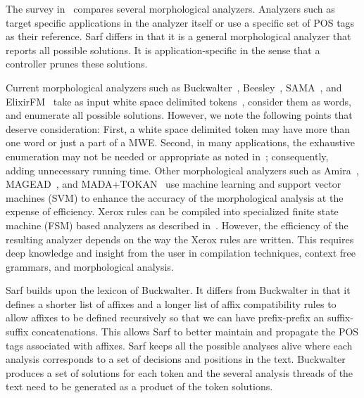 \documentclass[11pt]{article}
\begin{document}
The survey in~\cite{Sughaiyer:04} compares
several morphological analyzers. 
Analyzers such as~\cite{Khoja:01,Darwish:02} 
target specific applications in the 
analyzer itself or use a specific set of POS tags
as their reference.
Sarf differs in that it is a general morphological 
analyzer that reports all possible solutions. 
It is application-specific in the sense that a controller 
prunes these solutions. 

Current morphological analyzers such as %
Buckwalter~,
Beesley~,
SAMA~\cite{Kulick:10},
and ElixirFM~\cite{Otakar:07} 
take as input white space delimited tokens~\cite{Kulick:10},
consider them as words,
and enumerate all possible solutions. 
However, we note the following points that deserve consideration:
First, a white space delimited token may have 
more than one word or just a part of a MWE.
Second, in many applications, the exhaustive enumeration may not be needed or appropriate as noted in~\cite{Maamouri:10}; consequently, adding unnecessary running time.
Other morphological analyzers such as 
Amira~\cite{Diab:07,Benajiba:07},
MAGEAD~\cite{Habash:05}, and MADA+TOKAN~\cite{Habash:09} 
use machine learning and support vector machines (SVM) 
to enhance the accuracy of the morphological analysis at the expense 
of efficiency.
Xerox rules can be compiled into specialized finite state
machine (FSM) based analyzers as described in~\cite{Beesley:03}.
However, the efficiency of the resulting analyzer depends on the
way the Xerox rules are written. 
This requires deep knowledge and insight from the user
in compilation techniques, context free grammars, 
and morphological analysis.

Sarf builds upon the lexicon of Buckwalter.
It differs from Buckwalter in that it defines a shorter list of affixes
and a longer list of affix compatibility rules to allow 
affixes to be defined recursively
so that we can have prefix-prefix an suffix-suffix 
concatenations.
This allows Sarf to better maintain and propagate 
the POS tags associated with affixes. 
Sarf keeps all the possible analyses alive where each analysis
corresponds to a set of decisions and positions in the text. 
Buckwalter produces a set of solutions for each token 
and the several analysis threads of the text need to be 
generated as a product of the token solutions. 
\end{document}
